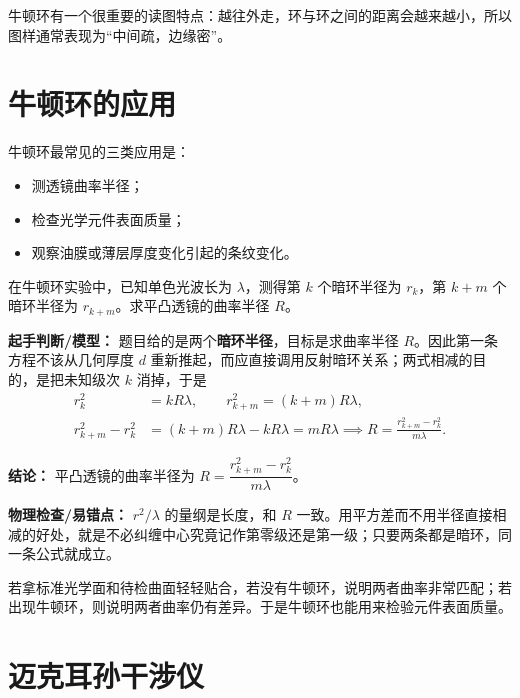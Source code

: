 \documentclass[lang=cn,11pt]{elegantbook}
\begin{document}
\begin{remark}
牛顿环有一个很重要的读图特点：越往外走，环与环之间的距离会越来越小，所以图样通常表现为“中间疏，边缘密”。
\end{remark}

\section{牛顿环的应用}

牛顿环最常见的三类应用是：
\begin{itemize}
  \item 测透镜曲率半径；
  \item 检查光学元件表面质量；
  \item 观察油膜或薄层厚度变化引起的条纹变化。
\end{itemize}

\begin{example}[牛顿环测曲率半径]
在牛顿环实验中，已知单色光波长为 \(\lambda\)，测得第 \(k\) 个暗环半径为 \(r_k\)，第 \(k+m\) 个暗环半径为 \(r_{k+m}\)。求平凸透镜的曲率半径 \(R\)。
\end{example}

\begin{solution}
\textbf{起手判断/模型：} 题目给的是两个\textbf{暗环半径}，目标是求曲率半径 \(R\)。因此第一条方程不该从几何厚度 \(d\) 重新推起，而应直接调用反射暗环关系；两式相减的目的，是把未知级次 \(k\) 消掉，于是
\[
\begin{aligned}
r_k^2&=kR\lambda,\qquad r_{k+m}^2=(k+m)R\lambda,\\
r_{k+m}^2-r_k^2&=(k+m)R\lambda-kR\lambda=mR\lambda
\implies
R=\frac{r_{k+m}^2-r_k^2}{m\lambda}.
\end{aligned}
\]

\textbf{结论：} 平凸透镜的曲率半径为 \(R=\dfrac{r_{k+m}^2-r_k^2}{m\lambda}\)。

\textbf{物理检查/易错点：} \(r^2/\lambda\) 的量纲是长度，和 \(R\) 一致。用平方差而不用半径直接相减的好处，就是不必纠缠中心究竟记作第零级还是第一级；只要两条都是暗环，同一条公式就成立。
\end{solution}

\begin{remark}
若拿标准光学面和待检曲面轻轻贴合，若没有牛顿环，说明两者曲率非常匹配；若出现牛顿环，则说明两者曲率仍有差异。于是牛顿环也能用来检验元件表面质量。
\end{remark}

\section{迈克耳孙干涉仪}
\end{document}
